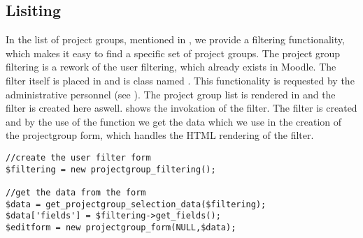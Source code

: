 \subsection{Lisiting}
In the list of project groups, mentioned in , we provide a filtering functionality, which makes it easy to find a specific set of project groups.
The project group filtering is a rework of the user filtering, which already exists in Moodle.
The filter itself is placed in  and is class named .
This functionality is requested by the administrative personnel (see ).
The project group list is rendered in  and the filter is created here aswell. 
 shows the invokation of the filter. 
The filter is created and by the use of the function  we get the data which we use in the creation of the projectgroup form, which handles the HTML rendering of the filter. 
\begin{lstlisting}[style=phpCode, caption=\myCaption{The invokation of the filtering mechanism}, label=moodlefiltering]
//create the user filter form
$filtering = new projectgroup_filtering();

//get the data from the form
$data = get_projectgroup_selection_data($filtering);
$data['fields'] = $filtering->get_fields();
$editform = new projectgroup_form(NULL,$data);
\end{lstlisting}\begin{comment}$\end{comment}

